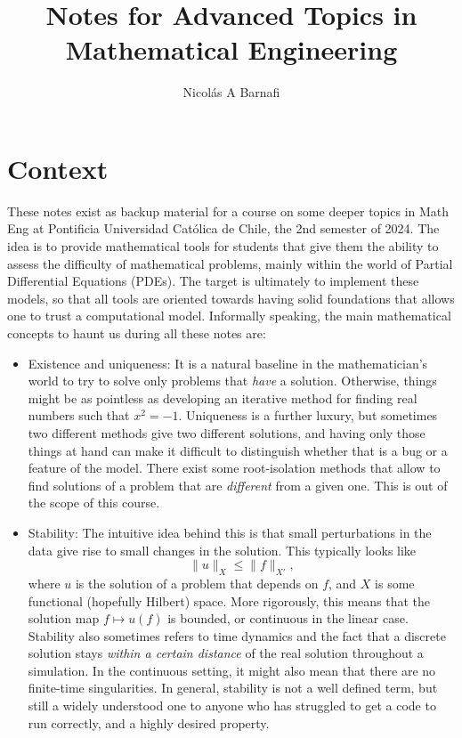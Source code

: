 \documentclass{article}
\title{Notes for Advanced Topics in Mathematical Engineering}
\author{Nicol\'as A Barnafi}
\begin{document}
\maketitle

\section*{Context}

These notes exist as backup material for a course on some deeper topics in Math Eng at Pontificia Universidad Católica de Chile, the 2nd semester of 2024. The idea is to provide mathematical tools for students that give them the ability to assess the difficulty of mathematical problems, mainly within the world of Partial Differential Equations (PDEs). The target is ultimately to implement these models, so that all tools are oriented towards having solid foundations that allows one to trust a computational model. Informally speaking, the main mathematical concepts to haunt us during all these notes are: 
    \begin{itemize}
        \item Existence and uniqueness: It is a natural baseline in the mathematician's world to try to solve only problems that \emph{have} a solution. Otherwise, things might be as pointless as developing an iterative method for finding real numbers such that $x^2 = -1$. Uniqueness is a further luxury, but sometimes two different methods give two different solutions, and having only those things at hand can make it difficult to distinguish whether that is a bug or a feature of the model. There exist some root-isolation methods that allow to find solutions of a problem that are \emph{different} from a given one. This is out of the scope of this course. 
        \item Stability: The intuitive idea behind this is that small perturbations in the data give rise to small changes in the solution. This typically looks like 
            $$ \| u\|_X \leq \| f\|_{X'}, $$
        where $u$ is the solution of a problem that depends on $f$, and $X$ is some functional (hopefully Hilbert) space. More rigorously, this means that the solution map $f \mapsto u(f)$ is bounded, or continuous in the linear case. Stability also sometimes refers to time dynamics and the fact that a discrete solution stays \emph{within a certain distance} of the real solution throughout a simulation. In the continuous setting, it might also mean that there are no finite-time singularities. In general, stability is not a well defined term, but still a widely understood one to anyone who has struggled to get a code to run correctly, and a highly desired property. 
    \end{itemize}
\end{document}
